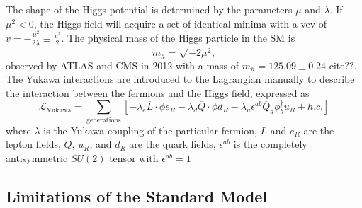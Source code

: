 The shape of the Higgs potential is determined by the parameters $\mu$ and $\lambda$. 
If $\mu^2 < 0$, the Higgs field will acquire a set of identical minima with a vev of 
$v=-\frac{\mu^2}{2\lambda} \equiv \frac{v^2}{2}$. The physical mass of the Higgs particle in the SM is
\begin{equation}
m_h = \sqrt{-2\mu^2},
\end{equation}
observed by ATLAS and CMS in 2012 with a mass of $m_h = 125.09 \pm 0.24$ \GeV cite??.
The Yukawa interactions are introduced to the Lagrangian manually to describe the interaction between the fermions and the Higgs field, 
expressed as 
\begin{equation}
 \mathcal{L}_\text{Yukawa} = \sum_\text{generations} \left[-\lambda_e \overline{L} \cdot \phi e_R - \lambda_d \overline{Q} \cdot \phi d_R 
 - \lambda_u \epsilon^{ab} \overline{Q}_a \phi_b^{\dagger} u_R + h.c. \right]
\end{equation}
where $\lambda$ is the Yukawa coupling of the particular fermion, $L$ and $e_R$ are the lepton fields, 
$Q$, $u_R$, and $d_R$ are the quark fields, $\epsilon^{ab} $ is the completely antisymmetric  $ SU\left(2\right) $ tensor with $\epsilon^{ab} = 1$


\subsection{Limitations of the Standard Model}



 









